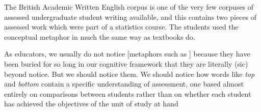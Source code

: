 The British Academic Written English corpus is one of the very few
corpuses of assessed undergraduate student writing available, and this
contains two pieces of assessed work which were part of a statistics
course.  The students used the conceptual metaphor  in much the same way as textbooks do.


\vfill

\begin{singlespace}
\setlength{\epigraphwidth}{.7\textwidth} %
\epigraph{As educators, we usually do not notice [metaphors such as
    ] because they have been buried for so long in
  our cognitive framework that they are literally (sic) beyond notice.
  But we should notice them.  We should notice how words like
  \emph{top} and \emph{bottom} contain a specific understanding of
  assessment, one based almost entirely on comparisons between
  students rather than on whether each student has achieved the
  objectives of the unit of study at hand}{\cite[page 6]{badley2012}}
\end{singlespace}
